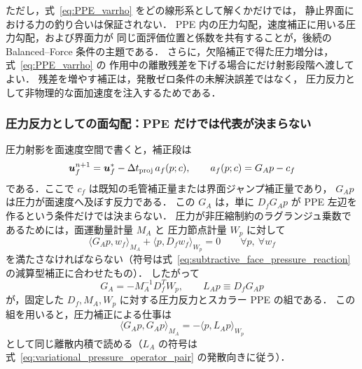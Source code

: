 ただし，式~\eqref{eq:PPE_varrho} をどの線形系として解くかだけでは，
静止界面における力の釣り合いは保証されない．
PPE 内の圧力勾配，速度補正に用いる圧力勾配，および界面力が
同じ面評価位置と係数を共有することが，後続の Balanced--Force 条件の主題である．
さらに，欠陥補正で得た圧力増分は，式~\eqref{eq:PPE_varrho} の
作用中の離散残差を下げる場合にだけ射影段階へ渡してよい．
残差を増やす補正は，発散ゼロ条件の未解決誤差ではなく，
圧力反力として非物理的な面加速度を注入するためである．

\subsubsection{圧力反力としての面勾配：PPE だけでは代表が決まらない}
\label{sec:variational_pressure_reaction}

圧力射影を面速度空間で書くと，補正段は
\begin{equation}
  \bm{u}_f^{n+1}
  =
  \bm{u}_f^\ast
  -
  \Delta t_{\mathrm{proj}}\,
  a_f(p;c),
  \qquad
  a_f(p;c)=G_Ap-c_f
  \label{eq:subtractive_face_pressure_reaction}
\end{equation}
である．ここで $c_f$ は既知の毛管補正量または界面ジャンプ補正量であり，
$G_Ap$ は圧力が面速度へ及ぼす反力である．
この $G_A$ は，単に $D_fG_Ap$ が PPE 左辺を作るという条件だけでは決まらない．
圧力が非圧縮制約のラグランジュ乗数であるためには，面運動量計量 $M_A$ と
圧力節点計量 $W_p$ に対して
\begin{equation}
  \langle G_Ap,w_f\rangle_{M_A}
  +
  \langle p,D_fw_f\rangle_{W_p}
  =0
  \qquad
  \forall p,\ \forall w_f
  \label{eq:pressure_reaction_green_identity}
\end{equation}
を満たさなければならない（符号は式~\eqref{eq:subtractive_face_pressure_reaction}
の減算型補正に合わせたもの）．
したがって
\begin{equation}
  G_A=-M_A^{-1}D_f^TW_p,
  \qquad
  L_Ap\equiv D_fG_Ap
  \label{eq:variational_pressure_operator_pair}
\end{equation}
が，固定した $D_f,M_A,W_p$ に対する圧力反力とスカラー PPE の組である．
この組を用いると，圧力補正による仕事は
\begin{equation}
  \langle G_Ap,G_Ap\rangle_{M_A}
  =
  -\langle p,L_Ap\rangle_{W_p}
  \label{eq:pressure_reaction_energy_identity}
\end{equation}
として同じ離散内積で読める（$L_A$ の符号は
式~\eqref{eq:variational_pressure_operator_pair} の発散向きに従う）．


